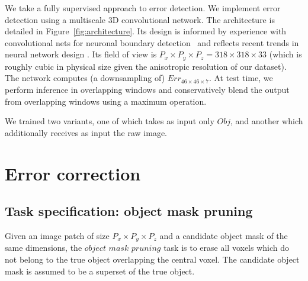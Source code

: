 \documentclass{article}
\begin{document}
We take a fully supervised approach to error detection. We implement error
detection using a multiscale 3D convolutional network. The architecture is
detailed in Figure~\ref{fig:architecture}. Its design is informed by experience
with convolutional nets for neuronal boundary detection~\cite{kisuk} and
reflects recent trends in neural network design \cite{unet,resnet}. Its field of
view is $P_x\times P_y\times P_z=318\times 318\times 33$ (which is roughly cubic
in physical size given the anisotropic resolution of our dataset). The network
computes (a downsampling of) $Err_{46 \times 46 \times 7}$. At test time, we
perform inference in overlapping windows and conservatively blend the output
from overlapping windows using a maximum operation.

We trained two variants, one of which takes as input only $Obj$, and another which additionally receives as input the raw image.

\section{Error correction}
\subsection{Task specification: object mask pruning}
Given an image patch of size $P_x\times P_y\times P_z$ and a candidate object mask of the same dimensions, the $\textit{object mask pruning}$ task is to erase all voxels which do not belong to the true object overlapping the central voxel.  The candidate object mask is assumed to be a superset of the true object.
\end{document}
